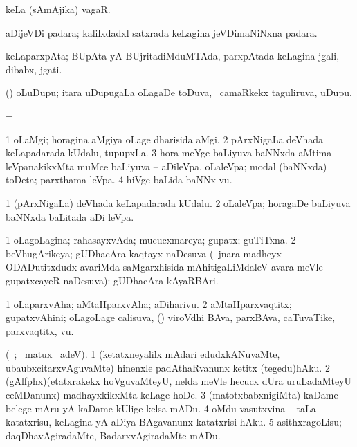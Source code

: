 {\bentry
{} 
\gl{\nA}
\expl{}
\bmng
 keLa (sAmAjika) vagaR. 
\emng
\eentry

\bentry
{} 
\gl{\nA}
\expl{}
\bmng
 aDijeVDi padara; kalilxdadxl satxrada keLagina jeVDimaNiNxna padara. 
\emng
\eentry

\bentry
{} 
\gl{\nA}
\expl{}
\bmng
 keLaparxpAta; BUpAta yA BUjritadiMduMTAda, parxpAtada keLagina jgali, dibabx, jgati. 
\emng
\eentry

\bentry
{} 
\gl{\nA}
\expl{}
\bmng
 (\bava) oLuDupu; itara uDupugaLa oLagaDe toDuva, \kanmu\ camaRkekx taguliruva, uDupu. 
\emng
\eentry

\bentry
{} 
\gl{\nA}
\expl{}
\bmng
=  
\emng
\eentry

\bentry
{} 
\gl{\nA}
\expl{}
\bmng
\bnum
\num{1} oLaMgi; horagina aMgiya oLage dharisida aMgi. 
\num{2} pArxNigaLa deVhada keLapadarada kUdalu, tupupxLa. 
\num{3} hora meYge baLiyuva baNNxda aMtima leVpanakikxMta muMce baLiyuva -- aDileVpa, oLaleVpa; modal (baNNxda) toDeta; parxthama leVpa. 
\num{4} hiVge baLida baNNx \mo vu. 
\enum
\emng
\eentry

\bentry
{} 
\gl{\nA}
\expl{}
\bmng
\bnum
\num{1} (pArxNigaLa) deVhada keLapadarada kUdalu. 
\num{2} oLaleVpa; horagaDe baLiyuva baNNxda baLitada aDi leVpa. 
\enum
\emng
\eentry

\bentry
{} 
\gl{\gu}
\expl{}
\bmng
\bnum
\num{1} oLagoLagina; rahasayxvAda; mucucxmareya; gupatx; guTiTxna. 
\num{2} beVhugArikeya; gUDhacAra kaqtayx naDesuva (\kanmu\ jnara madheyx ODADutitxdudx avariMda saMgarxhisida mAhitigaLiMdaleV avara meVle gupatxcayeR naDesuva):  gUDhacAra kAyaRBAri. 
\enum
\emng
\eentry

\bentry
{} 
\gl{\nA}
\expl{}
\bmng
\emng
\eentry

\bentry
{} 
\gl{\nA}
\expl{}
\bmng
\bnum
\num{1} oLaparxvAha; aMtaHparxvAha; aDiharivu. 
\num{2} aMtaHparxvaqtitx; gupatxvAhini; oLagoLage calisuva, (\kanmu) viroVdhi BAva, parxBAva, caTuvaTike, parxvaqtitx, \mo vu. 
\enum
\emng
\eentry

\bentry
{} 
\gl{\sakirx}
\expl{}
\bmng
 (\vakaq\ ; \BU\ matux \BUkaq\ adeV). 
\bnum
\num{1} (ketatxneyalilx mAdari edudxkANuvaMte, ubaubxcitarxvAguvaMte) hinenxle padAthaRvanunx ketitx (tegedu)hAku. 
\num{2} (gAlfphx)(etatxrakekx hoVguvaMteyU, nelda meVle hecucx dUra uruLadaMteyU ceMDanunx) madhayxkikxMta keLage hoDe. 
\num{3} (matotxbabxnigiMta) kaDame belege mAru yA kaDame kUlige kelsa mADu. 
\num{4} oMdu vasutxvina -- taLa katatxrisu, keLagina yA aDiya BAgavanunx katatxrisi hAku. 
\num{5} asithxragoLisu; daqDhavAgiradaMte, BadarxvAgiradaMte mADu. 
\enum
\emng
\eentry

}
